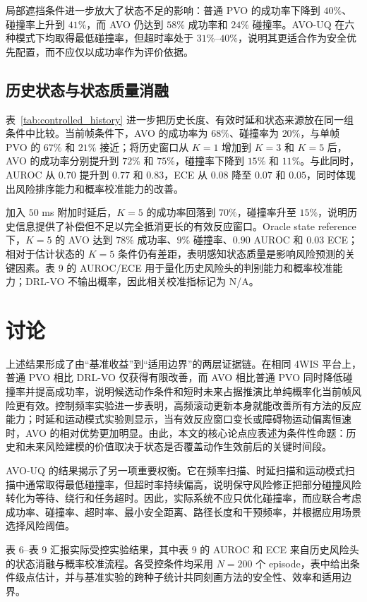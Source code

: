\documentclass[UTF8,10pt,a4paper,twocolumn]{ctexart}
\begin{document}
局部遮挡条件进一步放大了状态不足的影响：普通 PVO 的成功率下降到 $40\%$、碰撞率上升到 $41\%$，而 AVO 仍达到 $58\%$ 成功率和 $24\%$ 碰撞率。AVO-UQ 在六种模式下均取得最低碰撞率，但超时率处于 $31\%$--$40\%$，说明其更适合作为安全优先配置，而不应仅以成功率作为评价依据。

\subsection{历史状态与状态质量消融}

表~\ref{tab:controlled_history} 进一步把历史长度、有效时延和状态来源放在同一组条件中比较。当前帧条件下，AVO 的成功率为 $68\%$、碰撞率为 $20\%$，与单帧 PVO 的 $67\%$ 和 $21\%$ 接近；将历史窗口从 $K=1$ 增加到 $K=3$ 和 $K=5$ 后，AVO 的成功率分别提升到 $72\%$ 和 $75\%$，碰撞率下降到 $15\%$ 和 $11\%$。与此同时，AUROC 从 $0.70$ 提升到 $0.77$ 和 $0.83$，ECE 从 $0.08$ 降至 $0.07$ 和 $0.05$，同时体现出风险排序能力和概率校准能力的改善。

加入 $50$ ms 附加时延后，$K=5$ 的成功率回落到 $70\%$，碰撞率升至 $15\%$，说明历史信息提供了补偿但不足以完全抵消更长的有效反应窗口。Oracle state reference 下，$K=5$ 的 AVO 达到 $78\%$ 成功率、$9\%$ 碰撞率、$0.90$ AUROC 和 $0.03$ ECE；相对于估计状态的 $K=5$ 条件仍有差距，表明感知状态质量是影响风险预测的关键因素。表 9 的 AUROC/ECE 用于量化历史风险头的判别能力和概率校准能力；DRL-VO 不输出概率，因此相关校准指标记为 N/A。

\section{讨论}

上述结果形成了由“基准收益”到“适用边界”的两层证据链。在相同 4WIS 平台上，普通 PVO 相比 DRL-VO 仅获得有限改善，而 AVO 相比普通 PVO 同时降低碰撞率并提高成功率，说明候选动作条件和短时未来占据推演比单纯概率化当前帧风险更有效。控制频率实验进一步表明，高频滚动更新本身就能改善所有方法的反应能力；时延和运动模式实验则显示，当有效反应窗口变长或障碍物运动偏离恒速时，AVO 的相对优势更加明显。由此，本文的核心论点应表述为条件性命题：历史和未来风险建模的价值取决于状态是否覆盖动作生效前后的关键时间段。

AVO-UQ 的结果揭示了另一项重要权衡。它在频率扫描、时延扫描和运动模式扫描中通常取得最低碰撞率，但超时率持续偏高，说明保守风险修正把部分碰撞风险转化为等待、绕行和任务超时。因此，实际系统不应只优化碰撞率，而应联合考虑成功率、碰撞率、超时率、最小安全距离、路径长度和干预频率，并根据应用场景选择风险阈值。

表 6--表 9 汇报实际受控实验结果，其中表 9 的 AUROC 和 ECE 来自历史风险头的状态消融与概率校准流程。各受控条件均采用 $N=200$ 个 episode，表中给出条件级点估计，并与基准实验的跨种子统计共同刻画方法的安全性、效率和适用边界。
\end{document}
